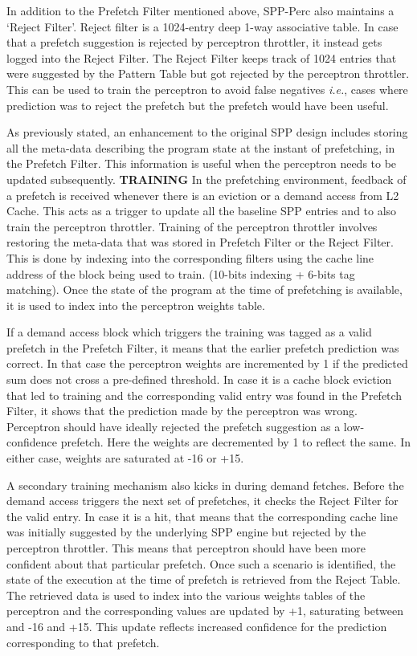 \documentclass{sig-alternate}
\begin{document}
In addition to the Prefetch Filter mentioned above, SPP-Perc also maintains a `Reject Filter'. 
Reject filter is a 1024-entry deep 1-way associative table. 
In case that a prefetch suggestion is rejected by perceptron throttler, it instead gets logged into the Reject Filter. 
The Reject Filter keeps track of 1024 entries that were suggested by the Pattern Table but got rejected by the perceptron throttler. 
This can be used to train the perceptron to avoid false negatives \textit{i.e.}, cases where prediction was to reject the prefetch but the prefetch would have been useful.

As previously stated, an enhancement to the original SPP design includes storing all the meta-data describing the program state at the instant of prefetching, in the Prefetch Filter. 
This information is useful when the perceptron needs to be updated subsequently. 
\newline \newline
\textbf{TRAINING}\newline
In the prefetching environment, feedback of a prefetch is received whenever there is an eviction or a demand access from L2 Cache. 
This acts as a trigger to update all the baseline SPP entries and to also train the perceptron throttler. 
Training of the perceptron throttler involves restoring the meta-data that was stored in Prefetch Filter or the Reject Filter. 
This is done by indexing into the corresponding filters using the cache line address of the block being used to train. (10-bits indexing + 6-bits tag matching). 
Once the state of the program at the time of prefetching is available, it is used to index into the perceptron weights table. 

If a demand access block which triggers the training  was tagged as a valid prefetch in the Prefetch Filter, it means that the earlier prefetch prediction was correct. 
In that case the perceptron weights are incremented by 1 if the predicted sum does not cross a pre-defined threshold. 
 In case it is a cache block eviction that led to training and the corresponding valid entry was found in the Prefetch Filter, it shows that the prediction made by the perceptron was wrong. 
Perceptron should have ideally rejected the prefetch suggestion as a low-confidence prefetch. 
Here the weights are decremented by 1 to reflect the same. 
In either case, weights are saturated at -16 or +15.

A secondary training mechanism also kicks in during demand fetches. 
Before the demand access triggers the next set of prefetches, it checks the Reject Filter for the valid entry. 
In case it is a hit, that means that the corresponding cache line was initially suggested by the underlying SPP engine but rejected by the perceptron throttler. 
This means that perceptron should have been more confident about that particular prefetch. 
Once such a scenario is identified, the state of the execution at the time of prefetch is retrieved from the Reject Table. 
The retrieved data is used to index into the various weights tables of the perceptron and the corresponding values are updated by +1, saturating between and -16 and +15. 
This update reflects increased confidence for the prediction corresponding to that prefetch.  
\end{document}
